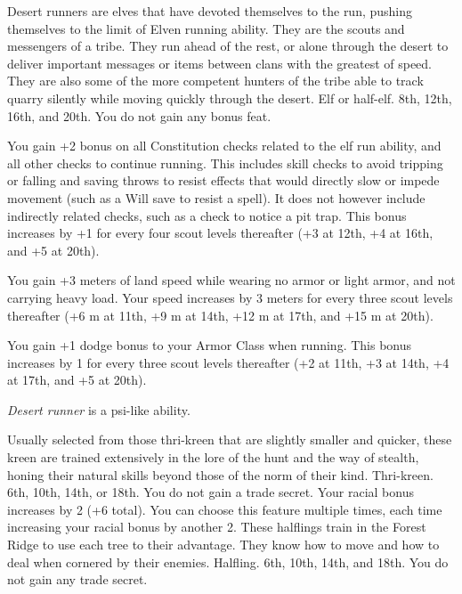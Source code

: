 {Desert runners are elves that have devoted themselves to the run, pushing themselves to the limit of Elven running ability. They are the scouts and messengers of a tribe. They run ahead of the rest, or alone through the desert to deliver important messages or items between clans with the greatest of speed. They are also some of the more competent hunters of the tribe able to track quarry silently while moving quickly through the desert.}
{Elf or half-elf.}
{8th, 12th, 16th, and 20th.}
{You do not gain any bonus feat.}
{
	You gain +2 bonus on all Constitution checks related to the elf run ability, and all other checks to continue running. This includes skill checks to avoid tripping or falling and saving throws to resist effects that would directly slow or impede movement (such as a Will save to resist a  spell). It does not however include indirectly related checks, such as a  check to notice a pit trap. This bonus increases by +1 for every four scout levels thereafter (+3 at 12th, +4 at 16th, and +5 at 20th).

	You gain +3 meters of land speed while wearing no armor or light armor, and not carrying heavy load. Your speed increases by 3 meters for every three scout levels thereafter (+6 m at 11th, +9 m at 14th, +12 m at 17th, and +15 m at 20th).

	You gain +1 dodge bonus to your Armor Class when running. This bonus increases by 1 for every three scout levels thereafter (+2 at 11th, +3 at 14th, +4 at 17th, and +5 at 20th).

	\emph{Desert runner} is a psi-like ability.
}
{Usually selected from those thri-kreen that are slightly smaller and quicker, these kreen are trained extensively in the lore of the hunt and the way of stealth, honing their natural skills beyond those of the norm of their kind.}
{Thri-kreen.}
{6th, 10th, 14th, or 18th.}
{You do not gain a trade secret.}
{
	Your racial  bonus increases by 2 (+6 total). You can choose this feature multiple times, each time increasing your racial bonus by another 2.
}
{These halflings train in the Forest Ridge to use each tree to their advantage. They know how to move and how to deal when cornered by their enemies.}
{Halfling.}
{6th, 10th, 14th, and 18th.}
{You do not gain any trade secret.}
